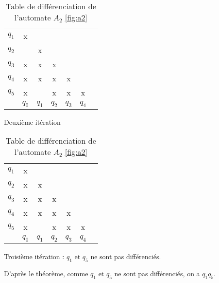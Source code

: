 \begin{example}
\begin{table}[H]
 \vspace{0.5cm}

 \begin{subtable}{.5\textwidth}
 \centering
 \begin{tabular}{ccccccc}
	 \cline{2-2}
	 \multicolumn{1}{c|}{$q_1$} & \multicolumn{1}{c|}{x} &&&&\\
	 \cline{2-3}
	 \multicolumn{1}{c|}{$q_2$} & \multicolumn{1}{c|}{} &\multicolumn{1}{c|}{x}&&&\\
	 \cline{2-4}
	 \multicolumn{1}{c|}{$q_3$} & \multicolumn{1}{c|}{x} &\multicolumn{1}{c|}{x}&\multicolumn{1}{c|}{x}&&\\
	 \cline{2-5}
	 \multicolumn{1}{c|}{$q_4$} & \multicolumn{1}{c|}{x} &\multicolumn{1}{c|}{x}&\multicolumn{1}{c|}{x}&\multicolumn{1}{c|}{x}&\\
	 \cline{2-6}
	 \multicolumn{1}{c|}{$q_5$} & \multicolumn{1}{c|}{x} & \multicolumn{1}{c|}{}&\multicolumn{1}{c|}{x}&\multicolumn{1}{c|}{x}&\multicolumn{1}{c|}{x}\\
	 \cline{2-6}
	 \multicolumn{1}{c}{} & $q_0$&$q_1$&$q_2$&$q_3$&$q_4$\\
 \end{tabular}
 \caption{Deuxième itération}
 \end{subtable}
 \begin{subtable}{.5\textwidth}
 \centering
 \begin{tabular}{ccccccc}
	 \cline{2-2}
	 \multicolumn{1}{c|}{$q_1$} & \multicolumn{1}{c|}{x} &&&&\\
	 \cline{2-3}
	 \multicolumn{1}{c|}{$q_2$} & \multicolumn{1}{c|}{x} &\multicolumn{1}{c|}{x}&&&\\
	 \cline{2-4}
	 \multicolumn{1}{c|}{$q_3$} & \multicolumn{1}{c|}{x} &\multicolumn{1}{c|}{x}&\multicolumn{1}{c|}{x}&&\\
	 \cline{2-5}
	 \multicolumn{1}{c|}{$q_4$} & \multicolumn{1}{c|}{x} &\multicolumn{1}{c|}{x}&\multicolumn{1}{c|}{x}&\multicolumn{1}{c|}{x}&\\
	 \cline{2-6}
	 \multicolumn{1}{c|}{$q_5$} & \multicolumn{1}{c|}{x} & \multicolumn{1}{c|}{}&\multicolumn{1}{c|}{x}&\multicolumn{1}{c|}{x}&\multicolumn{1}{c|}{x}\\
	 \cline{2-6}
	 \multicolumn{1}{c}{} & $q_0$&$q_1$&$q_2$&$q_3$&$q_4$\\
 \end{tabular}
 \caption{Troisième itération : $q_1$ et $q_5$ ne sont pas différenciés.}
\end{subtable}
\caption{Table de différenciation de l'automate $A_2$ \ref{fig:a2}}
\label{tab:tfaa2}
\end{table}

D'après le théorème, comme $q_1$ et $q_5$ ne sont pas différenciés, on a $q_1$\rf$q_5$.

\end{example}


